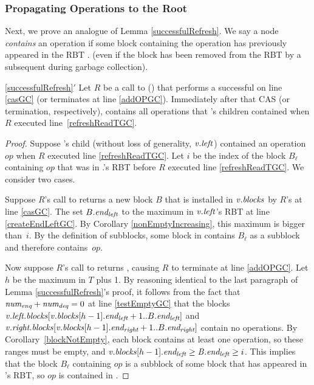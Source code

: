 \subsubsection{Propagating Operations to the Root}

Next, we prove an analogue of Lemma \ref{successfulRefresh}.
We say a node  \emph{contains} an operation
if some block containing the operation has previously appeared in the RBT .
(even if the block has been removed from the RBT by a subsequent  during garbage collection).

\begin{customlemma}{\ref{successfulRefresh}$'$}\label{successfulRefreshGC}
Let $R$ be a call to () that performs a successful  on line \ref{casGC} (or terminates at line \ref{addOPGC}).
Immediately after that CAS (or termination, respectively),  contains all operations that 's children contained 
when $R$ executed line~\ref{refreshReadTGC}.
\end{customlemma}
\begin{proof}
Suppose 's child (without loss of generality, $\mbox{\textnormal{\textit{v}}}.\mbox{\textit{left}}$) contained an operation $op$ 
when $R$ executed line \ref{refreshReadTGC}.
Let $i$ be the index of the block $B_\ell$ containing $op$ that was in .'s RBT before 
$R$ executed line \ref{refreshReadTGC}.
We consider two cases.

Suppose $R$'s call to  returns a new block $B$
that is installed in $\mbox{\textnormal{\textit{v}}}.\mbox{\textit{blocks}}$
by $R$'s  at line \ref{casGC}.
The  set $B.\mbox{\textit{end\textsubscript{left}}}$ to the maximum  in $\mbox{\textnormal{\textit{v}}}.\mbox{\textit{left}}$'s RBT at line \ref{createEndLeftGC}.
By Corollary \ref{nonEmptyIncreasing}, this maximum  is bigger than~$i$.
By the definition of subblocks, some block in  contains $B_\ell$ as a subblock
and therefore  contains~$op$.

Now suppose $R$'s call to  returns \nl, causing $R$ to terminate at line \ref{addOPGC}.
Let $h$ be the maximum  in $T$ plus 1.
By reasoning identical to the last paragraph of Lemma \ref{successfulRefresh}'s proof,
it follows from the fact that $\mbox{\textnormal{\textit{num\textsubscript{enq}}}}+\mbox{\textnormal{\textit{num\textsubscript{deq}}}}=0$ at line \ref{testEmptyGC}
that the blocks $\mbox{\textnormal{\textit{v}}}.\mbox{\textit{left.blocks}}[\mbox{\textnormal{\textit{v}}}.\mbox{\textit{blocks}}[h-1].\mbox{\textit{end\textsubscript{left}}}+1..B.\mbox{\textit{end\textsubscript{left}}}]$ and
$\mbox{\textnormal{\textit{v}}}.\mbox{\textit{right.blocks}}[\mbox{\textnormal{\textit{v}}}.\mbox{\textit{blocks}}[h-1].\mbox{\textit{end\textsubscript{right}}}+1..B.\mbox{\textit{end\textsubscript{right}}}]$
contain no operations.
By Corollary~\ref{blockNotEmpty}, each block contains at least one operation, so
these ranges must be empty, and $\mbox{\textnormal{\textit{v}}}.\mbox{\textit{blocks}}[h-1].\mbox{\textit{end\textsubscript{left}}} \geq \mbox{\textnormal{\textit{B}}}.\mbox{\textit{end\textsubscript{left}}}\geq i$.
This implies that the block $B_\ell$ containing $op$ is a subblock of some block that has appeared
in 's RBT, so $op$ is contained in .
\end{proof}

